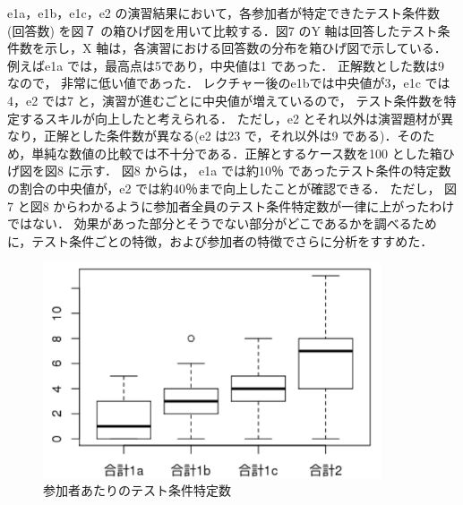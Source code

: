 \documentclass[a4paper,12pt]{jreport}
\begin{document}
 e1a，e1b，e1c，e2 の演習結果において，各参加者が特定できたテスト条件数 (回答数) を図７ の箱ひげ図を用いて比較する．図7 のY 軸は回答したテスト条件数を示し，X 軸は，各演習における回答数の分布を箱ひげ図で示している． 例えばe1a では，最高点は5であり，中央値は1 であった． 正解数とした数は9 なので， 非常に低い値であった． レクチャー後のe1bでは中央値が3，e1c では4，e2 では7 と，演習が進むごとに中央値が増えているので， テスト条件数を特定するスキルが向上したと考えられる．
 ただし，e2 とそれ以外は演習題材が異なり，正解とした条件数が異なる(e2 は23 で，それ以外は9 である)．そのため，単純な数値の比較では不十分である．正解とするケース数を100 とした箱ひげ図を図8 に示す．
 図8 からは， e1a では約10％ であったテスト条件の特定数の割合の中央値が，e2 では約40％まで向上したことが確認できる． ただし， 図7 と図8 からわかるように参加者全員のテスト条件特定数が一律に上がったわけではない． 効果があった部分とそうでない部分がどこであるかを調べるために，テスト条件ごとの特徴，および参加者の特徴でさらに分析をすすめた．

\begin{figure}[h]
  \begin{center}
  \includegraphics[width=10cm]{./image/D-3-Fig10.png}
  \caption{参加者あたりのテスト条件特定数}
  \label{fig:D-3-Fig10}
  \end{center}
   \end{figure}
\end{document}
